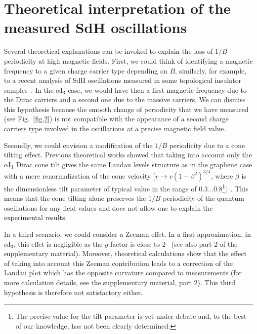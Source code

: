 \documentclass[doublecol]{epl2}
\begin{document}

\section{Theoretical interpretation of the measured SdH oscillations}

Several theoretical explanations can be invoked to explain the loss of $1/B$ periodicity at high magnetic fields. First, we could think of identifying a magnetic 
frequency to a given charge carrier type depending on $B$, similarly, for example, to a recent analysis of SdH oscillations measured in some topological insulator 
samples~\cite{SdHVeyrat}. In the $\alpha$I$_{3}$ case, we would have then a first magnetic frequency due to the Dirac carriers and a second one due to the massive carriers. 
We can dismiss this hypothesis because the smooth change of periodicity that we have measured (see Fig.~\ref{fig.2}) is not compatible with the appearance of a second charge 
carriers type involved in the oscillations at a precise magnetic field value. 

Secondly, we could envision a modification of the $1/B$ periodicity due to a cone tilting effect. Previous theoretical works showed that taking into account only the $\alpha$I$_{3}$ Dirac cone tilt gives the same Landau levels structure as in the graphene case with a mere renormalization of the cone velocity 
[$v\rightarrow v\left(1-\beta^ 2\right)^ {3/4}$, where $\beta$ is the dimensionless tilt parameter of typical value in the range of $0.3\ldots 0.8$\footnote{The precise value for the tilt parameter is yet under debate and, to the best of our knowledge, has not been clearly determined.}]~\cite{alphaTiltedCone1,alphaTiltedCone1b,alphaTiltedCone2}. 
This means that the cone tilting alone preserves the $1/B$ periodicity of the quantum oscillations for any field values and does not allow one to explain the experimental results. 

In a third scenario, we could consider a Zeeman effet. In a first approximation, in $\alpha$I$_{3}$, this effet is negligible as the $g$-factor is close to $2$~\cite{gFactor} (see also part $2$ of the supplementary material). %
Moreover, theoretical calculations show that the effect of taking into account this Zeeman contribution leads to a correction of the Landau plot which has the opposite curvature compared to measurements (for more calculation details, see the supplementary material, part $2$). This third hypothesis is therefore not satisfactory either. 
\end{document}
